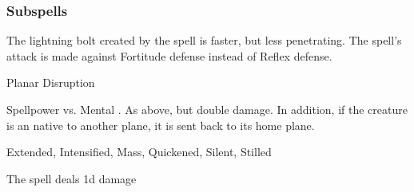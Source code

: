 \subsubsection{Subspells}
The lightning bolt created by the spell is faster, but less penetrating.
The spell's attack is made against Fortitude defense instead of Reflex defense.
\begin{spellsection}{Planar Disruption}
\begin{spellheader}
\end{spellheader}
\begin{spellcontent}
\begin{spelltargetinginfo}
\end{spelltargetinginfo}
\begin{spelleffects}
\begin{spellattack}{Spellpower vs. Mental}
\spellsuccess {}.
\spellcritical
As above, but double damage.
In addition, if the creature is an  native to another plane, it is sent back to its home plane.
\end{spellattack}
\end{spelleffects}
\end{spellcontent}
\begin{spellfooter}
 Extended, Intensified, Mass, Quickened, Silent, Stilled
\end{spellfooter}
\begin{spellsubcontent}
\begin{spellcantrip}
The spell deals \minus1d damage
\end{spellcantrip}
\end{spellsubcontent}
\end{spellsection}
